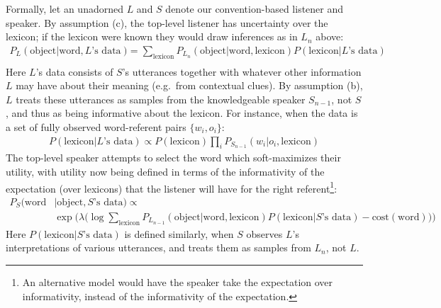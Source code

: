 \documentclass{article} %
\newcommand{\word}{\text{word}}
\newcommand{\obj}{\text{object}}
\newcommand{\lex}{\text{lexicon}}
\newcommand{\prior}{P_{\text{prior}}(\obj)}
\begin{document}
Formally, let an unadorned $L$ and $S$ denote our convention-based
listener and speaker. By assumption (c), the top-level listener has uncertainty over the lexicon; if the lexicon were known they would draw inferences as in $L_n$ above:
%
\begin{align*}
  P_L(\obj | \word, \text{$L$'s data}) &=  \sum_\lex P_{L_n}(\obj | \word, \lex) P(\lex | \text{$L$'s data}) \\
\end{align*}
Here $L$'s data consists of $S$'s utterances together with whatever
other information $L$ may have about their meaning (e.g.~from
contextual clues). 
By assumption (b), $L$ treats these  utterances
as samples from the knowledgeable speaker $S_{n-1}$, not $S$, and thus
as being informative about the lexicon. For instance, when the data is a set of fully observed 
word-referent pairs $\{w_i, o_i\}$:
\begin{align*}
  P(\lex | \text{$L$'s data}) \propto P(\lex) \prod_i P_{S_{n-1}}(w_i|o_i,  \lex)
\end{align*}
The top-level speaker attempts to select the word which soft-maximizes
their utility, with utility now being defined in terms of the
informativity of the expectation (over lexicons) that the listener
will have for the right referent\footnote{An alternative model would
  have the speaker take the expectation over informativity, instead of
  the informativity of the expectation.}:
\begin{align*}
  P_S(\word & | \obj, \text{$S$'s data})  \propto \\
 &\exp\Big(\lambda \big(\log  \sum_\lex P_{L_{n-1}}(\obj | \word, \lex) P(\lex|\text{$S$'s data}) - \text{cost}(\word)\big)\Big)
\end{align*}
Here $P(\lex|\text{$S$'s data})$ is defined similarly, when $S$ observes
$L$'s interpretations of various utterances, and treats them as
samples from $L_n$, not $L$.
\end{document}
